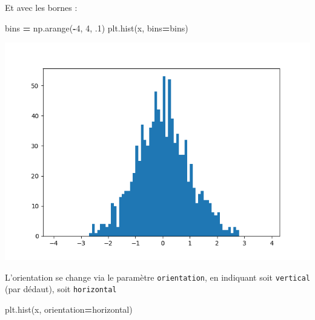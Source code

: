 \documentclass[
  12pt,
]{book}
\newenvironment{Shaded}{\begin{snugshade}}{\end{snugshade}}
\newcommand{\DecValTok}[1]{\textcolor[rgb]{0.00,0.00,0.81}{#1}}
\newcommand{\FloatTok}[1]{\textcolor[rgb]{0.00,0.00,0.81}{#1}}
\newcommand{\NormalTok}[1]{#1}
\newcommand{\OperatorTok}[1]{\textcolor[rgb]{0.81,0.36,0.00}{\textbf{#1}}}
\newcommand{\StringTok}[1]{\textcolor[rgb]{0.31,0.60,0.02}{#1}}
\numberwithin{equation}{section}
\numberwithin{countremarque}{section}
\begin{document}
Et avec les bornes :

\begin{Shaded}
\begin{Highlighting}[]
\NormalTok{bins }\OperatorTok{=}\NormalTok{ np.arange(}\OperatorTok{{-}}\DecValTok{4}\NormalTok{, }\DecValTok{4}\NormalTok{, }\FloatTok{.1}\NormalTok{)}
\NormalTok{plt.hist(x, bins}\OperatorTok{=}\NormalTok{bins)}
\end{Highlighting}
\end{Shaded}

\begin{center}\includegraphics[width=9.03in]{figs/pyplot/histogramme_bins_2} \end{center}

L'orientation se change via le paramètre \texttt{orientation}, en indiquant soit \texttt{\textquotesingle{}vertical\textquotesingle{}} (par dédaut), soit \texttt{\textquotesingle{}horizontal\textquotesingle{}}

\begin{Shaded}
\begin{Highlighting}[]
\NormalTok{plt.hist(x, orientation}\OperatorTok{=}\StringTok{\textquotesingle{}horizontal\textquotesingle{}}\NormalTok{)}
\end{Highlighting}
\end{Shaded}
\end{document}
